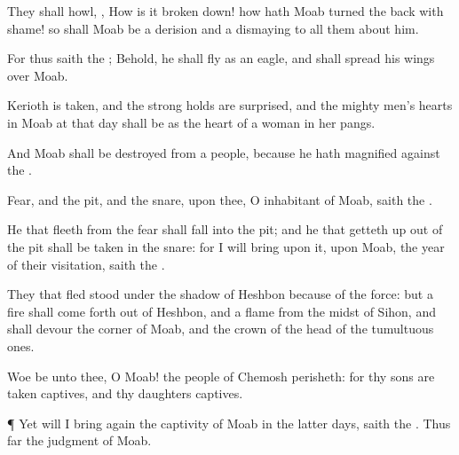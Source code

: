 {They shall
howl,
{}, How is it broken
down! how hath
Moab
turned the
back with
shame! so shall
Moab be a
derision and a
dismaying to all them
about him.

For thus
saith the
{}; Behold, he shall
fly as an
eagle, and shall
spread his
wings over
Moab.

Kerioth is
taken, and the strong
holds are
surprised, and the mighty
men’s
hearts in
Moab at that
day shall be as the
heart of a
woman in her
pangs.

And
Moab shall be
destroyed from
{} a
people, because he hath
magnified
{} against the
{}.

Fear, and the
pit, and the
snare,
{} upon thee, O
inhabitant of
Moab,
saith the
{}.

He that
fleeth
from the
fear shall
fall into the
pit; and he that getteth
up out of the
pit shall be
taken in the
snare: for I will
bring upon it,
{} upon
Moab, the
year of their
visitation,
saith the
{}.

They that
fled
stood under the
shadow of
Heshbon because of the
force: but a
fire shall come
forth out of
Heshbon, and a
flame from the
midst of
Sihon, and shall
devour the
corner of
Moab, and the crown of the
head of the
tumultuous
ones.

Woe be unto thee, O
Moab! the
people of
Chemosh
perisheth: for thy
sons are
taken
captives, and thy
daughters
captives.


\par }{\PP {}¶ Yet will I bring
again the
captivity of
Moab in the
latter
days,
saith the
{}. Thus
far
{} the
judgment of
Moab.




\par }
